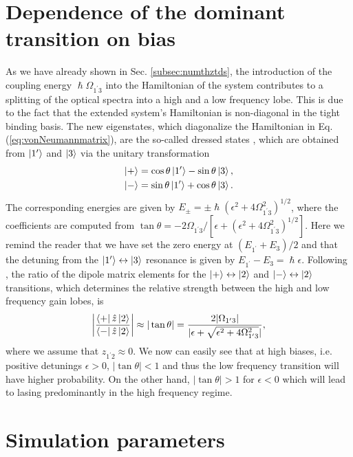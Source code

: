 \documentclass[10pt]{article}
\begin{document}
\begin{appendices}
\section{Dependence of the dominant transition on bias}
\label{sec:biasdependence}
As we have already shown in Sec. \ref{subsec:numthztds}, the introduction of
the coupling energy $\hslash\Omega_{1^{\prime}3}$ into the Hamiltonian of the
system contributes to a splitting of the optical spectra into a high and a low
frequency lobe. This is due to the fact that the extended system's Hamiltonian
is non-diagonal in the tight binding basis. The new eigenstates, which
diagonalize the Hamiltonian in Eq. (\ref{eq:vonNeumannmatrix}), are the
so-called dressed states \cite{callebaut2005importance,dupont2010simplified},
which are obtained from $\Ket{1'}$ and $\Ket{3}$ via the unitary
transformation
\begin{align}
	\Ket{+} &  =\cos\theta\Ket{1'}-\sin\theta\Ket{3}%
	,\nonumber\label{eq:dressedstates}\\
	\Ket{-} &  =\sin\theta\Ket{1'}+\cos\theta\Ket{3}.
\end{align}
The corresponding energies are given by $E_{\pm}=\pm\hslash(\epsilon
^{2}+4\Omega_{1^{\prime}3}^{2})^{1/2}$, where the coefficients are computed from
$\tan\theta=-2\Omega_{1^{\prime}3}/[\epsilon+\left(  \epsilon^{2}%
+4\Omega_{1^{\prime}3}^{2}\right)  ^{1/2}].$ Here we remind the reader that we
have set the zero energy at $(E_{1^{\prime}}+E_{3})/2$ and that the detuning
from the $\Ket{1^{\prime}}\leftrightarrow\Ket{3}$ resonance is given by
$E_{1^{\prime}}-E_{3}=\hslash\epsilon$. Following \cite{dupont2010simplified},
the ratio of the dipole matrix elements for the $\Ket{+}\leftrightarrow\Ket
{2}$ and $\Ket{-}\leftrightarrow\Ket{2}$ transitions, which determines the
relative strength between the high and low frequency gain lobes, is
\[
\left|  \frac{\Bra{+}\hat{z}\Ket{2}}{\Bra{-}\hat{z}\Ket{2}}\right|
\approx|\tan\theta|=\frac{2|\Omega_{1^{\prime}3}|}{|\epsilon+\sqrt
	{\epsilon^{2}+4\Omega_{1^{\prime}3}^{2}}|},
\]
where we assume that $z_{1^{\prime}2}\approx0$. We now can easily see that at
high biases, i.e. positive detunings $\epsilon>0$, $|\tan\theta|<1$ and thus
the low frequency transition will have higher probability. On the other hand,
$|\tan\theta|>1$ for $\epsilon<0$ which will lead to lasing predominantly in
the high frequency regime.

\section{Simulation parameters}		
\label{sec:params}


\end{appendices}
\end{document}
